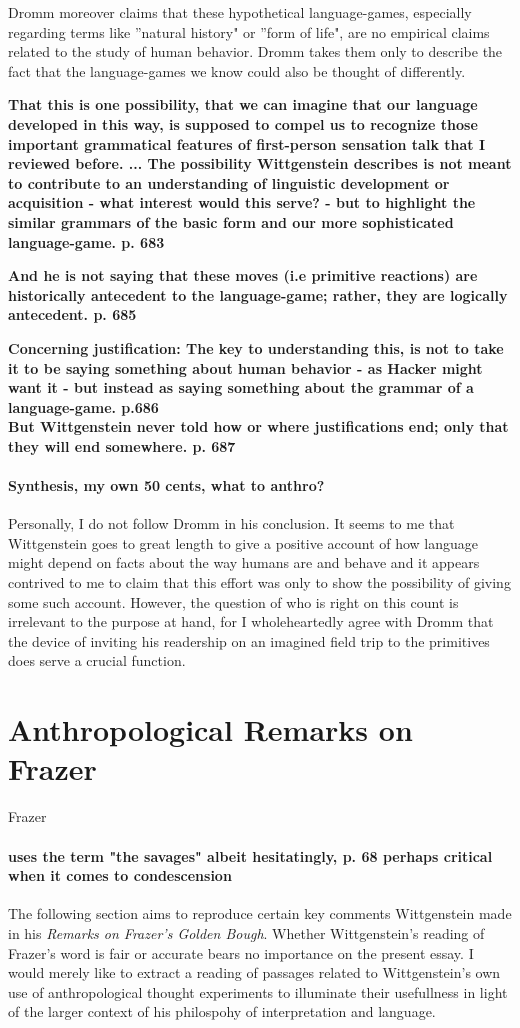 \documentclass{article}
\begin{document}
Dromm moreover claims that these hypothetical language-games, especially regarding terms like ''natural history" or ''form of life", are no empirical claims related to the study of human behavior. Dromm takes them only to describe the fact that the language-games we know could also be thought of differently.

\textbf{That this is one possibility, that we can imagine that our language developed in this way, is supposed to compel us to recognize those important grammatical features of first-person sensation talk that I reviewed before. ... The possibility Wittgenstein describes is not meant to contribute to an understanding of linguistic development or acquisition - what interest would this serve? - but to highlight the similar grammars of the basic form and our more sophisticated language-game. p. 683}

\textbf{And he is not saying that these moves (i.e primitive reactions) are historically antecedent to the language-game; rather, they are logically antecedent. p. 685}

\textbf{Concerning justification: The key to understanding this, is not to take it to be saying something about human behavior - as Hacker might want it - but instead as saying something about the grammar of a language-game. p.686\\
But Wittgenstein never told how or where justifications end; only that they will end somewhere. p. 687}
\paragraph{Synthesis, my own 50 cents, what to anthro?}
Personally, I do not follow Dromm in his conclusion. It seems to me that Wittgenstein goes to great length to give a positive account of how language might depend on facts about the way humans are and behave and it appears contrived to me to claim that this effort was only to show the possibility of giving some such account. However, the question of who is right on this count is irrelevant to the purpose at hand, for I wholeheartedly agree with Dromm that the device of inviting his readership on an imagined field trip to the primitives does serve a crucial function. 

\section{Anthropological Remarks on Frazer}
\hypertarget{sec3}{Frazer}
\paragraph{uses the term "the savages" albeit hesitatingly, p. 68 perhaps critical when it comes to condescension}
The following section aims to reproduce certain key comments Wittgenstein made in his \textit{Remarks on Frazer's Golden Bough}. Whether Wittgenstein's reading of Frazer's word is fair or accurate bears no importance on the present essay. I would merely like to extract a reading of passages related to Wittgenstein's own use of anthropological thought experiments to illuminate their usefullness in light of the larger context of his philospohy of interpretation and language. 
\end{document}
